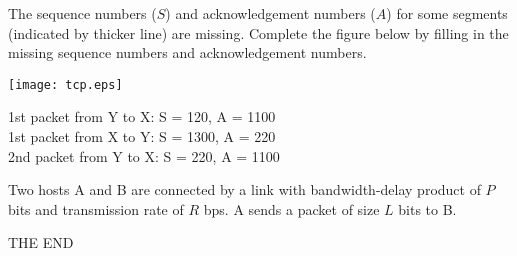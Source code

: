 \documentclass[a4paper,11pt,answers]{exam}
\begin{document}
\begin{questions}
The sequence numbers ($S$) and acknowledgement numbers ($A$) for 
some segments (indicated by thicker line) are missing.  Complete 
the figure below by filling in the missing sequence numbers and 
acknowledgement numbers.

\centerline{
        \texttt{[image: tcp.eps]}
}

\begin{solution}
1st packet from Y to X: S = 120, A = 1100\\
1st packet from X to Y: S = 1300, A = 220\\
2nd packet from Y to X: S = 220, A = 1100\\
\end{solution}

\newpage
\question
Two hosts A and B are connected by a link with bandwidth-delay 
product of $P$ bits and transmission rate of $R$ bps.  A sends 
a packet of size $L$ bits to B.

\end{questions}
\vfill
\center\Huge\sf THE END
\end{document}
